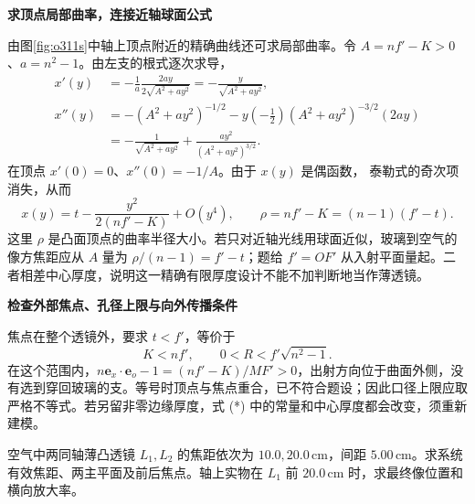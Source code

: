 \begin{solution}
\par\medskip{}\noindent\textbf{求顶点局部曲率，连接近轴球面公式}\par\nobreak
由图\ref{fig:o311s}中轴上顶点附近的精确曲线还可求局部曲率。令 $A=nf'-K>0$、$a=n^2-1$。由左支的根式逐次求导，
\begin{align*}
 x'(y)&=-\frac1a\frac{2ay}{2\sqrt{A^2+ay^2}}
       =-\frac y{\sqrt{A^2+ay^2}},\\
 x''(y)&=-(A^2+ay^2)^{-1/2}
 -y\left(-\frac12\right)(A^2+ay^2)^{-3/2}(2ay)\\
 &=-\frac1{\sqrt{A^2+ay^2}}+\frac{ay^2}{(A^2+ay^2)^{3/2}}.
\end{align*}
在顶点 $x'(0)=0$、$x''(0)=-1/A$。由于 $x(y)$ 是偶函数，
泰勒式的奇次项消失，从而
\[
x(y)=t-\frac{y^2}{2(nf'-K)}+O(y^4),\qquad
\rho=nf'-K=(n-1)(f'-t).
\]
这里 $\rho$ 是凸面顶点的曲率半径大小。若只对近轴光线用球面近似，玻璃到空气的像方焦距应从 $A$ 量为 $\rho/(n-1)=f'-t$；题给 $f'=OF'$ 从入射平面量起。二者相差中心厚度，说明这一精确有限厚度设计不能不加判断地当作薄透镜。




\par\medskip{}\noindent\textbf{检查外部焦点、孔径上限与向外传播条件}\par\nobreak
焦点在整个透镜外，要求 \(t<f'\)，等价于
\[
 K<nf',\qquad
 \boxed{0<R<f'\sqrt{n^2-1}}.
\]
在这个范围内，\(n\boldsymbol e_x\cdot\boldsymbol e_o-1=(nf'-K)/MF'>0\)，出射方向位于曲面外侧，没有选到穿回玻璃的支。等号时顶点与焦点重合，已不符合题设；因此口径上限应取严格不等式。若另留非零边缘厚度，式 (*) 中的常量和中心厚度都会改变，须重新建模。
\end{solution}

\begin{question}
\begin{example}[有效焦距与后焦距为何不同]\label{ex:r31}
空气中两同轴薄凸透镜 \(L_1,L_2\) 的焦距依次为 \(10.0,20.0\,\mathrm{cm}\)，间距 \(5.00\,\mathrm{cm}\)。求系统有效焦距、两主平面及前后焦点。轴上实物在 \(L_1\) 前 \(20.0\,\mathrm{cm}\) 时，求最终像位置和横向放大率。
\end{example}
\end{question}

